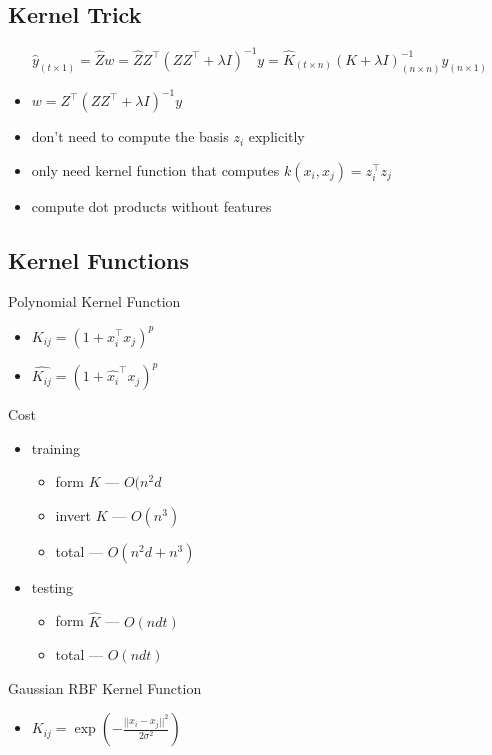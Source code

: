 \documentclass[10pt,landscape,a4paper]{article}
\begin{document}
\begin{multicols*}{5}
\subsection{Kernel Trick}
\begin{dmath*}
    \hat{y}_{(t \times 1)} = \hat{Z}w = \hat{Z} Z^\intercal (Z Z^\intercal + \lambda I)^{-1} y = \hat{K}_{(t \times n)} (K + \lambda I)_{(n \times n)}^{-1} y_{(n \times 1)}
\end{dmath*}
\begin{itemize}
    \item \(w = Z^\intercal (Z Z^\intercal + \lambda I)^{-1} y\)
    \item don't need to compute the basis \(z_i\) explicitly
    \item only need kernel function that computes \(k(x_i,x_j) = z_i^\intercal z_j\)
    \item compute dot products without features
\end{itemize}

\subsection{Kernel Functions}
Polynomial Kernel Function
\begin{itemize}
    \item \(K_{ij} = (1+x_i^\intercal x_j)^p\)
    \item \(\hat{K_{ij}} = (1+\hat{x_i}^\intercal x_j)^p\)
\end{itemize}
Cost
\begin{itemize}
    \item training
    \begin{itemize}
        \item form \(K\) --- \(O(n^2d\)
        \item invert \(K\) --- \(O(n^3)\)
        \item total --- \(O(n^2d + n^3)\)
    \end{itemize}
    \item testing
    \begin{itemize}
        \item form \(\hat{K}\) --- \(O(ndt)\)
        \item total --- \(O(ndt)\)
    \end{itemize}
\end{itemize}
Gaussian RBF Kernel Function
\begin{itemize}
    \item \(K_{ij} = \exp(- \frac{||x_i-x_j||^2}{2\sigma^2})\)
\end{itemize}


\end{multicols*}
\end{document}
